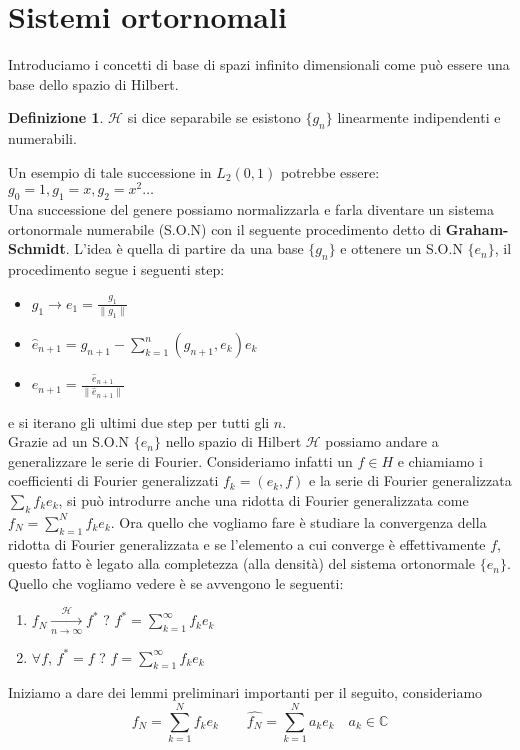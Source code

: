 \documentclass[12pt]{book}
\theoremstyle{plain}
\newcommand{\C}{\mathbb{C}}
\renewcommand{\H}{\mathcal{H}}
\theoremstyle{definition}
\newtheorem{dfn}[thm]{Definizione}
\theoremstyle{remark}
\begin{document}
\section{Sistemi ortornomali}
Introduciamo i concetti di base di spazi infinito dimensionali come può essere una base dello spazio di Hilbert.
\begin{dfn}
$\H$ si dice separabile se esistono $\{g_n\}$ linearmente indipendenti e numerabili.
\end{dfn}
Un esempio di tale successione in $L_2(0,1)$ potrebbe essere: $g_0 = 1,g_1=x,g_2=x^2\dots$\\
Una successione del genere possiamo normalizzarla e farla diventare un sistema ortonormale numerabile (S.O.N) con il seguente procedimento detto di \textbf{Graham-Schmidt}. L'idea è quella di partire da una base $\{g_n\}$ e ottenere un S.O.N $\{e_n\}$, il procedimento segue i seguenti step:
\begin{itemize}
\item $g_1 \to e_1 = \frac{g_1}{\|g_1\|}$
\item $\hat{e}_{n+1} = g_{n+1}-\displaystyle\sum_{k=1}^n(g_{n+1},e_k)e_k$
\item $e_{n+1} = \frac{\hat{e}_{n+1}}{\|\hat{e}_{n+1}\|}$ 
\end{itemize}
e si iterano gli ultimi due step per tutti gli $n$.\\
Grazie ad un S.O.N $\{e_n\}$ nello spazio di Hilbert $\H$ possiamo andare a generalizzare le serie di Fourier. Consideriamo infatti un $f\in H$ e chiamiamo i coefficienti di Fourier generalizzati $f_k=(e_k,f)$ e la serie di Fourier generalizzata $\sum_k f_ke_k$, si può introdurre anche una ridotta di Fourier generalizzata come $f_N = \displaystyle \sum_{k=1}^Nf_ke_k$. Ora quello che vogliamo fare è studiare la convergenza della ridotta di Fourier generalizzata e se l'elemento a cui converge è effettivamente $f$, questo fatto è legato alla completezza (alla densità) del sistema ortonormale $\{e_n\}$. Quello che vogliamo vedere è se avvengono le seguenti:
\begin{enumerate}
\item $f_N \xrightarrow[n\to \infty]{\H} f^* $ ?  $f^*=\displaystyle \sum_{k=1}^\infty f_ke_k$
\item $\forall f$, $f^*=f$ ? $f=\displaystyle \sum_{k=1}^\infty f_ke_k$
\end{enumerate}
Iniziamo a dare dei lemmi preliminari importanti per il seguito, consideriamo 
\[f_N = \displaystyle \sum_{k=1}^Nf_ke_k \qquad \hat{f_N} = \displaystyle \sum_{k=1}^Na_ke_k \quad a_k\in\C\]
\end{document}
